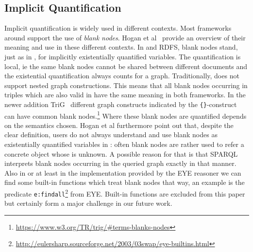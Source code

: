 

\subsection{Implicit Quantification}\label{iq}
Implicit quantification is widely used in different contexts. Most frameworks around \rdf support the use of \emph{blank nodes}. 
Hogan et al~\cite{blanks} provide an overview of their meaning and use in these different contexts. In \rdf and RDFS, blank nodes stand, just as in \nthree, for
implicitly existentially quantified variables. The quantification is local, ie the same blank nodes cannot be shared between different documents and the existential quantification 
always counts for a graph. Traditionally, \rdf does not support nested graph constructions. This means that all blank nodes occurring
in \nthree triples which  are also valid in \rdf have the same meaning in both frameworks.
In the newer addition TriG~\cite{TriG} different graph constructs indicated by the \texttt{\{\}}-construct can have common blank nodes.\footnote{\url{https://www.w3.org/TR/trig/\#terms-blanks-nodes}}
Where these blank nodes are quantified depends on the semantics chosen.
Hogan et al furthermore point out that, despite the clear definition, users do not always understand and use blank nodes as existentially quantified variables in \rdf: 
often blank nodes are rather used to refer a concrete object whose \iri is unknown. %
A possible reason 
for that is that SPARQL~\cite{sparql} interprets blank nodes occurring in the queried \rdf graph exactly in that manner. Also in \nthree or at least in the \nthree implementation provided by the 
EYE reasoner we can find some built-in functions which treat blank nodes that way, an example is the predicate 
\texttt{e:findall}\footnote{\url{http://eulersharp.sourceforge.net/2003/03swap/eye-builtins.html}} from EYE.
Built-in functions are excluded from this paper but certainly form a major challenge in our future work. 

